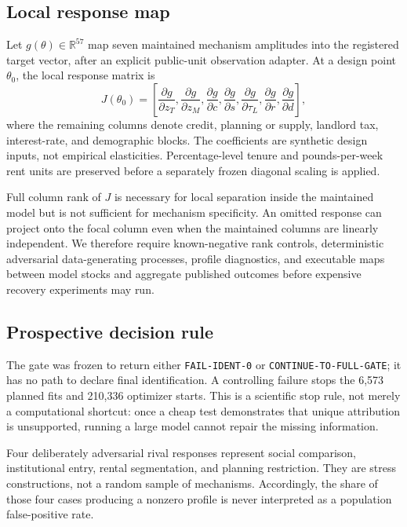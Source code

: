 \documentclass[11pt]{article}
\newcommand{\R}{\mathbb{R}}
\newcommand{\decision}[1]{\texttt{#1}}
\begin{document}
\subsection{Local response map}

Let $g(\theta)\in\R^{57}$ map seven maintained mechanism amplitudes into the
registered target vector, after an explicit public-unit observation adapter. At
a design point $\theta_0$, the local response matrix is
\begin{equation}
  J(\theta_0)=\left[
  \frac{\partial g}{\partial z_T},
  \frac{\partial g}{\partial z_M},
  \frac{\partial g}{\partial c},
  \frac{\partial g}{\partial s},
  \frac{\partial g}{\partial \tau_L},
  \frac{\partial g}{\partial r},
  \frac{\partial g}{\partial d}
  \right],
  \label{eq:jacobian}
\end{equation}
where the remaining columns denote credit, planning or supply, landlord tax,
interest-rate, and demographic blocks. The coefficients are synthetic design
inputs, not empirical elasticities. Percentage-level tenure and pounds-per-week
rent units are preserved before a separately frozen diagonal scaling is applied.

Full column rank of $J$ is necessary for local separation inside the maintained
model but is not sufficient for mechanism specificity. An omitted response can
project onto the focal column even when the maintained columns are linearly
independent. We therefore require known-negative rank controls, deterministic
adversarial data-generating processes, profile diagnostics, and executable maps
between model stocks and aggregate published outcomes before expensive recovery
experiments may run.

\subsection{Prospective decision rule}

The gate was frozen to return either \decision{FAIL-IDENT-0} or
\decision{CONTINUE-TO-FULL-GATE}; it has no path to declare final identification.
A controlling failure stops the 6,573 planned fits and 210,336 optimizer starts.
This is a scientific stop rule, not merely a computational shortcut: once a cheap
test demonstrates that unique attribution is unsupported, running a large model
cannot repair the missing information.

Four deliberately adversarial rival responses represent social comparison,
institutional entry, rental segmentation, and planning restriction. They are
stress constructions, not a random sample of mechanisms. Accordingly, the share
of those four cases producing a nonzero profile is never interpreted as a
population false-positive rate.
\end{document}
